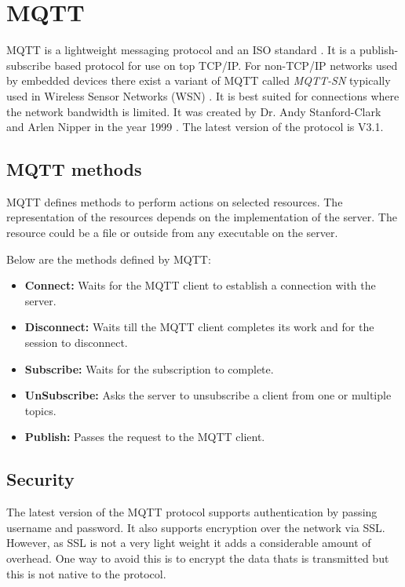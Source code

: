 \section{MQTT}

MQTT is a lightweight messaging protocol and an ISO standard \parencite{mqtt_wiki}. It is a publish-subscribe based protocol for use on top TCP/IP. For non-TCP/IP networks used by embedded devices there exist a variant of MQTT called \textit{MQTT-SN} typically used in Wireless Sensor Networks (WSN) \parencite{4554519}. It is best suited for connections where the network bandwidth is limited. It was created by Dr. Andy Stanford-Clark and Arlen Nipper in the year 1999 \parencite{mqtt_faq}. The latest version of the protocol is V3.1. 

\subsection{MQTT methods}

MQTT defines methods to perform actions on selected resources. The representation of the resources depends on the implementation of the server. The resource could be a file or outside from any executable on the server.

Below are the methods defined by MQTT:

\begin{itemize}
    \item\textbf{Connect:}
        Waits for the MQTT client to establish a connection with the server.

    \item\textbf{Disconnect:}
        Waits till the MQTT client completes its work and for the session to disconnect.

    \item\textbf{Subscribe:}
        Waits for the subscription to complete.

    \item\textbf{UnSubscribe:}
        Asks the server to unsubscribe a client from one or multiple topics.

    \item\textbf{Publish:}
        Passes the request to the MQTT client.

\end{itemize}

\subsection{Security}

The latest version of the MQTT protocol supports authentication by passing username and password. It also supports encryption over the network via SSL. However, as SSL is not a very light weight it adds a considerable amount of overhead. One way to avoid this is to encrypt the data thats is transmitted but this is not native to the protocol.

